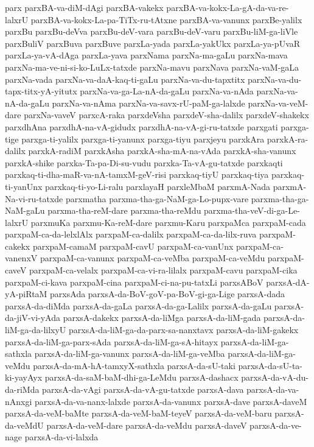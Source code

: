 {parx
parxBA-va-diM-dAgi
parxBA-vakekx
parxBA-va-kokx-La-gA-da-va-re-lalxrU
parxBA-va-kokx-La-pa-TiTx-ru-tAtxne
parxBA-va-vanunx
parxBe-yalilx
parxBu
parxBu-deVva
parxBu-deV-vara
parxBu-deV-varu
parxBu-liM-ga-liVle
parxBuliV
parxBuva
parxBuve
parxLa-yada
parxLa-yakUkx
parxLa-ya-pUvaR
parxLa-ya-vA-dAga
parxLa-yava
parxNama
parxNa-ma-gaLu
parxNa-mava
parxNa-ma-ve-ni-si-ko-LuLx-tatxde
parxNa-mavu
parxNava
parxNa-vaM-gaLa
parxNa-vada
parxNa-va-daA-kaq-ti-gaLu
parxNa-va-du-tapxtitx
parxNa-va-du-tapx-titx-yA-yitutx
parxNa-va-ga-La-nA-da-gaLu
parxNa-va-nAda
parxNa-va-nA-da-gaLu
parxNa-va-nAma
parxNa-va-savx-rU-paM-ga-lalxde
parxNa-va-veM-dare
parxNa-vaveV
parxcA-raka
parxdeVsha
parxdeV-sha-dalilx
parxdeV-shakekx
parxdhAna
parxdhA-na-vA-gidudx
parxdhA-na-vA-gi-ru-tatxde
parxgati
parxga-tige
parxga-ti-yalilx
parxga-ti-yanunx
parxga-tiyu
parxjeyu
parxkAra
parxkA-ra-dalilx
parxkA-radiM
parxkAsha
parxkA-sha-mA-na-vAda
parxkA-sha-vanunx
parxkA-shike
parxka-Ta-pa-Di-su-vudu
parxka-Ta-vA-gu-tatxde
parxkaqti
parxkaq-ti-dha-maR-va-nA-tamxM-geV-risi
parxkaq-tiyU
parxkaq-tiya
parxkaq-ti-yanUnx
parxkaq-ti-yo-Li-ralu
parxlayaH
parxleMbaM
parxmA-Nada
parxmA-Na-vi-ru-tatxde
parxmatha
parxma-tha-ga-NaM-ga-Lo-pupx-vare
parxma-tha-ga-NaM-gaLu
parxma-tha-reM-dare
parxma-tha-reMdu
parxma-tha-veV-di-ga-Le-lalxrU
parxmuKa
parxmu-Ka-reM-dare
parxmu-Karu
parxpaMca
parxpaM-cada
parxpaM-ca-da-lelxlAlx
parxpaM-ca-dalilx
parxpaM-ca-da-lilx-ruva
parxpaM-cakekx
parxpaM-camaM
parxpaM-cavU
parxpaM-ca-vanUnx
parxpaM-ca-vanenxV
parxpaM-ca-vanunx
parxpaM-ca-veMba
parxpaM-ca-veMdu
parxpaM-caveV
parxpaM-ca-velalx
parxpaM-ca-vi-ra-lilalx
parxpaM-cavu
parxpaM-cika
parxpaM-ci-kava
parxpaM-cina
parxpaM-ci-na-pu-tatxLi
parxsABoV
parxsA-dA-yA-piRtaM
parxsAda
parxsA-da-BoV-goV-pa-BoV-gi-ga-Lige
parxsA-dada
parxsA-da-diMda
parxsA-da-gaLa
parxsA-da-ga-Lalilx
parxsA-da-gaLu
parxsA-da-jiV-vi-yAda
parxsA-dakekx
parxsA-da-liMga
parxsA-da-liM-gada
parxsA-da-liM-ga-da-lilxyU
parxsA-da-liM-ga-da-parx-sa-nanxtavx
parxsA-da-liM-gakekx
parxsA-da-liM-ga-parx-sAda
parxsA-da-liM-ga-sA-hitayx
parxsA-da-liM-ga-sathxla
parxsA-da-liM-ga-vanunx
parxsA-da-liM-ga-veMba
parxsA-da-liM-ga-veMdu
parxsA-da-mA-hA-tamxyX-sathxla
parxsA-da-sU-taki
parxsA-da-sU-ta-ki-yayAyx
parxsA-da-saM-baM-dhi-ga-LeMdu
parxsA-dashacx
parxsA-da-vA-du-da-riMda
parxsA-da-vAgi
parxsA-da-vA-gu-tatxde
parxsA-dava
parxsA-da-va-nAnxgi
parxsA-da-va-nanx-lalxde
parxsA-da-vanunx
parxsA-dave
parxsA-daveM
parxsA-da-veM-baMte
parxsA-da-veM-baM-teyeV
parxsA-da-veM-baru
parxsA-da-veMdU
parxsA-da-veM-dare
parxsA-da-veMdu
parxsA-daveV
parxsA-da-ve-nage
parxsA-da-vi-lalxda
}
